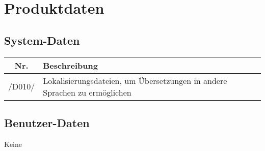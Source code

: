 \section{Produktdaten}
\subsection{System-Daten}
\begin{tabularx}{\textwidth}{| c | X | c |}
\hline
        \textbf{Nr.} & 
        \textbf{Beschreibung}\\
        \hline
        /D010/ & Lokalisierungsdateien, um Übersetzungen in andere Sprachen zu ermöglichen \\
        \hline
\end{tabularx}
\subsection{Benutzer-Daten}
Keine
